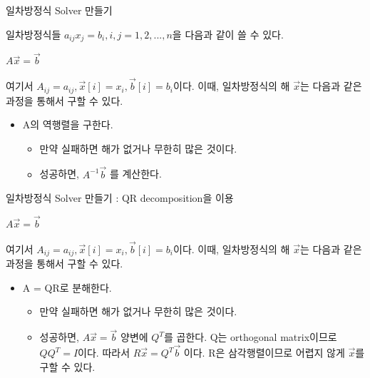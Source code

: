 \documentclass{beamer}
\begin{document}




\begin{frame}{일차방정식 Solver 만들기} 

일차방정식들 $a_{ij}x_j = b_i, i,j = 1,2,...,n$을 다음과 같이 쓸 수 있다. 

$A\vec{x} = \vec{b}$

여기서 $A_{ij} = a_{ij}, \vec{x}[i] = x_i, \vec{b}[i] = b_i$이다. 이때, 일차방정식의 해 $\vec{x}$는 다음과 같은 과정을 통해서 구할 수 있다. 

\begin{itemize} 
\item A의 역행렬을 구한다. 
\begin{itemize} 
\item 만약 실패하면 해가 없거나 무한히 많은 것이다. 
\item 성공하면, $A^{-1} \vec{b}$ 를 계산한다. 
\end{itemize}
\end{itemize}
\end{frame}

\begin{frame}{일차방정식 Solver 만들기 : QR decomposition을 이용} 

$A\vec{x} = \vec{b}$

여기서 $A_{ij} = a_{ij}, \vec{x}[i] = x_i, \vec{b}[i] = b_i$이다. 이때, 일차방정식의 해 $\vec{x}$는 다음과 같은 과정을 통해서 구할 수 있다. 

\begin{itemize} 
\item A = QR로 분해한다.  
\begin{itemize} 
\item 만약 실패하면 해가 없거나 무한히 많은 것이다. 
\item 성공하면, $A\vec{x} =\vec{b}$ 양변에 $Q^T$를 곱한다. Q는 orthogonal matrix이므로 $QQ^T=I$이다. 따라서 $R\vec{x} = Q^T\vec{b}$ 이다. R은 삼각행렬이므로 어렵지 않게 $\vec{x}$를 구할 수 있다. 
\end{itemize}
\end{itemize}
\end{frame}


\end{document}
